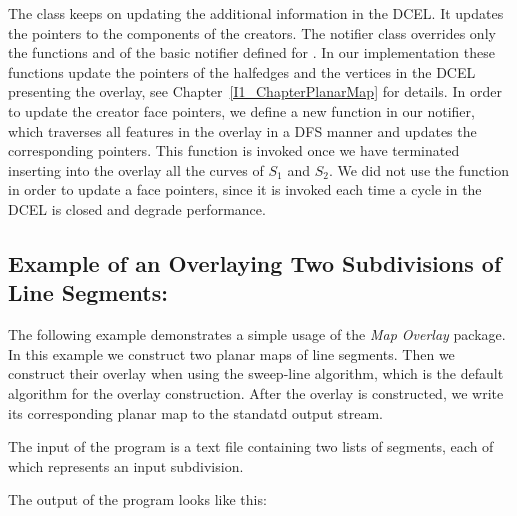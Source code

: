 The  class 
keeps on updating the additional information in the DCEL.
It updates the pointers to the components of the creators.
The notifier class overrides only the functions  
and  of the basic notifier defined for .
In our implementation these functions update 
the pointers of the halfedges and the vertices in the DCEL 
presenting the overlay, see Chapter~\ref{I1_ChapterPlanarMap} for details.
In order to update the creator face pointers, we define a new function in our notifier, 
which traverses all features in the overlay in a DFS manner and updates the 
corresponding pointers. This function is invoked once we have terminated 
inserting into the overlay all the curves of $S_1$ and $S_2$.
We did not use the  function in order to update a face pointers, 
since it is invoked each time a cycle in the DCEL is closed and degrade performance. 

\subsection{Example of an Overlaying Two Subdivisions of Line Segments:}
The following example demonstrates a simple usage of the {\it Map Overlay} package.
In this example we construct two planar maps of line segments. 
Then we construct their overlay when using the sweep-line algorithm, which is 
the default algorithm for the overlay construction. 
After the overlay is constructed, we write its corresponding planar map to the 
standatd output stream. 

The input of the program is a text file containing two lists of segments, 
each of which represents an input subdivision.

The output of the program looks like this:
